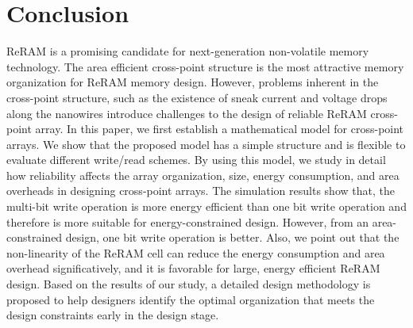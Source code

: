 \vspace{10pt}
\section{Conclusion}\label{sec:conclusion}

ReRAM is a promising candidate for next-generation non-volatile memory technology. The area efficient cross-point structure is the most attractive memory organization for ReRAM memory design. However, problems inherent in the cross-point structure, such as the existence of sneak current and voltage drops along the nanowires introduce challenges to the design of reliable ReRAM cross-point array. In this paper, we first establish a mathematical model for cross-point arrays. We show that the proposed model has a simple structure and is flexible to evaluate different write/read schemes. By using this model, we study in detail how reliability affects the array organization, size, energy consumption, and area overheads in designing cross-point arrays. The simulation results show that, the multi-bit write operation is more energy efficient than one bit write operation and therefore is more suitable for energy-constrained design. However, from an area-constrained design, one bit write operation is better. Also, we point out that the non-linearity of the ReRAM cell can reduce the energy consumption and area overhead significatively, and it is favorable for large, energy efficient ReRAM design. Based on the results of our study, a detailed design methodology is proposed to help designers identify the optimal organization that meets the design constraints early in the design stage.

